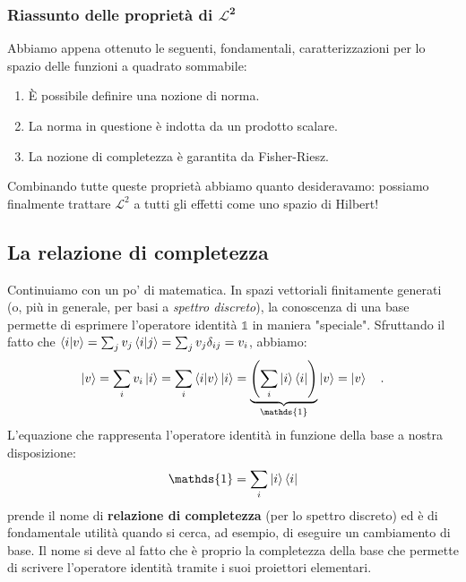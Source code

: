 \subsubsection{Riassunto delle proprietà di $\bm{\mathcal{L}^2}$}
Abbiamo appena ottenuto le seguenti, fondamentali, caratterizzazioni per lo spazio delle funzioni a quadrato sommabile:
\begin{enumerate}
    \item È possibile definire una nozione di norma.
    \item La norma in questione è indotta da un prodotto scalare.
    \item La nozione di completezza è garantita da Fisher-Riesz.
\end{enumerate}
Combinando tutte queste proprietà abbiamo quanto desideravamo: possiamo finalmente trattare $\mathcal{L}^2$ a tutti gli effetti come uno spazio di Hilbert!

\subsection{La relazione di completezza}
Continuiamo con un po' di matematica. In spazi vettoriali finitamente generati (o, più in generale, per basi a \emph{spettro discreto}), la conoscenza di una base permette di esprimere l'operatore identità $\mathds{1}$ in maniera "speciale". Sfruttando il fatto che $\bra{i}\ket{v} = \sum_j v_j \bra{i}\ket{j} = \sum_j v_j \delta_{ij} = v_i$, abbiamo:
\[
    \ket{v} = \sum_i v_i \ket{i} = \sum_i \bra{i}\ket{v} \ket{i} = \underbrace{\left( \sum_i \ket{i} \bra{i} \right)}_{\mathds{1}} \ket{v} = \ket{v} \quad.
\]
L'equazione che rappresenta l'operatore identità in funzione della base a nostra disposizione:
\begin{equation}
    \mathds{1} =  \sum_i \ket{i} \bra{i}  
\end{equation}
prende il nome di \textbf{relazione di completezza} (per lo spettro discreto) ed è di fondamentale utilità quando si cerca, ad esempio, di eseguire un cambiamento di base. Il nome si deve al fatto che è proprio la completezza della base che permette di scrivere l'operatore identità tramite i suoi proiettori elementari. 

